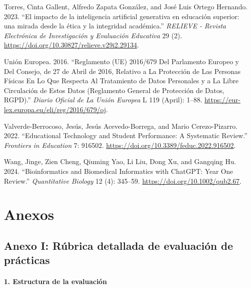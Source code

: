 \documentclass[
  11pt,
  a4paper,
  twoside]{scrreprt}
\newlength{\cslhangindent}
\newenvironment{CSLReferences}[2] %
 {\begin{list}{}{%
  \setlength{\itemindent}{0pt}
  \setlength{\leftmargin}{0pt}
  \setlength{\parsep}{0pt}
  \ifodd #1
   \setlength{\leftmargin}{\cslhangindent}
   \setlength{\itemindent}{-1\cslhangindent}
  \fi
  \setlength{\itemsep}{#2\baselineskip}}}
 {\end{list}}
\begin{document}
\begin{CSLReferences}{1}{1}
Torres, Cinta Gallent, Alfredo Zapata González, and José Luis Ortego
Hernando. 2023. {``El impacto de la inteligencia artificial generativa
en educación superior: una mirada desde la ética y la integridad
académica.''} \emph{RELIEVE - Revista Electrónica de Investigación y
Evaluación Educativa} 29 (2).
\url{https://doi.org/10.30827/relieve.v29i2.29134}.

Unión Europea. 2016. {``Reglamento (UE) 2016/679 Del Parlamento Europeo
y Del Consejo, de 27 de Abril de 2016, Relativo a La Protección de Las
Personas Físicas En Lo Que Respecta Al Tratamiento de Datos Personales y
a La Libre Circulación de Estos Datos (Reglamento General de Protección
de Datos, RGPD).''} \emph{Diario Oficial de La Unión Europea} L 119
(April): 1--88. \url{https://eur-lex.europa.eu/eli/reg/2016/679/oj}.

Valverde-Berrocoso, Jesús, Jesús Acevedo-Borrega, and Mario
Cerezo-Pizarro. 2022. {``Educational Technology and Student Performance:
A Systematic Review.''} \emph{Frontiers in Education} 7: 916502.
\url{https://doi.org/10.3389/feduc.2022.916502}.

Wang, Jinge, Zien Cheng, Qiuming Yao, Li Liu, Dong Xu, and Gangqing Hu.
2024. {``Bioinformatics and Biomedical Informatics with ChatGPT: Year
One Review.''} \emph{Quantitative Biology} 12 (4): 345--59.
\url{https://doi.org/10.1002/qub2.67}.

\end{CSLReferences}


\chapter{Anexos}\label{anexos}

\setcounter{secnumdepth}{0}

\section{Anexo I: Rúbrica detallada de evaluación de
prácticas}\label{sec-anex}

\subsubsection{1. Estructura de la
evaluación}\label{estructura-de-la-evaluaciuxf3n}
\end{document}
